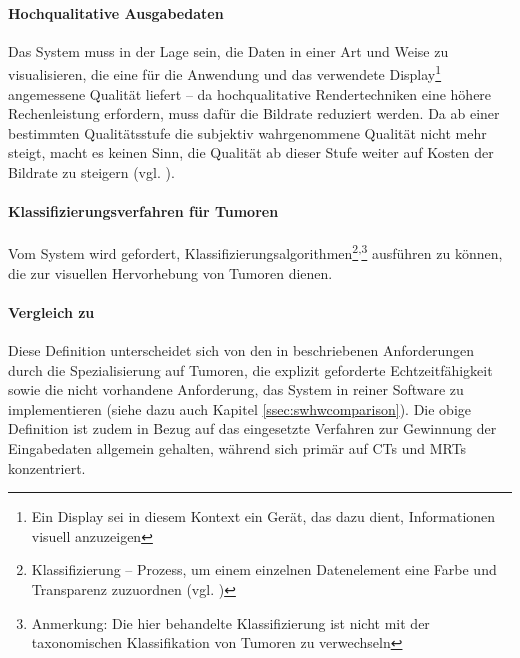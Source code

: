 \documentclass[ngerman,pdftex,paper=A4,DIV=calc,titlepage,12pt]{scrartcl}
\newtheorem[L]{boxedDefinition}{Definition}
\begin{document}
\paragraph{Hochqualitative Ausgabedaten} Das System muss in der Lage sein, die Daten in einer Art und Weise zu visualisieren, die eine für die Anwendung und das verwendete Display\footnote{Ein Display sei in diesem Kontext ein Gerät, das dazu dient, Informationen visuell anzuzeigen} angemessene Qualität liefert -- da hochqualitative Rendertechniken eine höhere Rechenleistung erfordern, muss dafür die Bildrate reduziert werden. Da ab einer bestimmten Qualitätsstufe die subjektiv wahrgenommene Qualität nicht mehr steigt, macht es keinen Sinn, die Qualität ab dieser Stufe weiter auf Kosten der Bildrate zu steigern (vgl. \cite[Kapitel 3.3, Seite 5]{Kutter2008}).

\paragraph{Klassifizierungsverfahren für Tumoren}Vom System wird gefordert, Klassifizierungsalgorithmen\footnote{Klassifizierung -- Prozess, um einem einzelnen Datenelement eine Farbe und Transparenz zuzuordnen (vgl. \cite[Kapitel 3.2.2, Seite 28]{Bruckner2004})}\textsuperscript{,}\footnote{Anmerkung: Die hier behandelte Klassifizierung ist nicht mit der taxonomischen Klassifikation von Tumoren zu verwechseln} ausführen zu können, die zur visuellen Hervorhebung von Tumoren dienen.

\paragraph{Vergleich zu \cite[Kapitel 3.1.1, Seite 17f.]{Bruckner2004}}\label{p:bru04comparison}
Diese Definition unterscheidet sich von den in \cite[Kapitel 3.1.1, Seite 17]{Bruckner2004} beschriebenen Anforderungen durch die Spezialisierung auf Tumoren, die explizit geforderte Echtzeitfähigkeit sowie die nicht vorhandene Anforderung, das System in reiner Software zu implementieren (siehe dazu auch Kapitel \vref{ssec:swhwcomparison}). Die obige Definition ist zudem in Bezug auf das eingesetzte Verfahren zur Gewinnung der Eingabedaten allgemein gehalten, während \cite{Bruckner2004} sich primär auf CTs und MRTs konzentriert.
\end{document}
